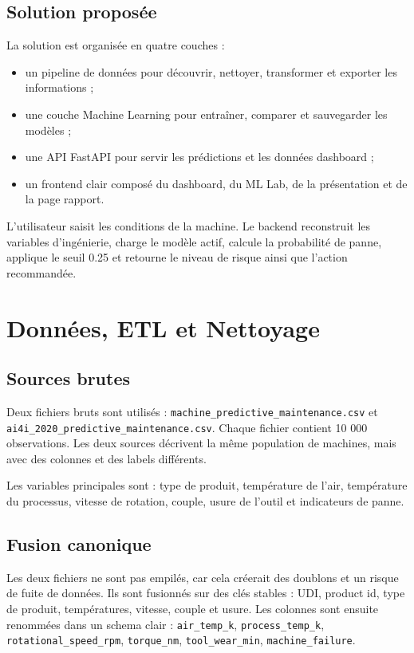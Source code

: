 \documentclass[12pt,a4paper]{report}
\begin{document}
\section{Solution proposée}
La solution est organisée en quatre couches :
\begin{itemize}
    \item un pipeline de données pour découvrir, nettoyer, transformer et exporter les informations ;
    \item une couche Machine Learning pour entraîner, comparer et sauvegarder les modèles ;
    \item une API FastAPI pour servir les prédictions et les données dashboard ;
    \item un frontend clair composé du dashboard, du ML Lab, de la présentation et de la page rapport.
\end{itemize}

L'utilisateur saisit les conditions de la machine. Le backend reconstruit les variables d'ingénierie, charge le modèle actif, calcule la probabilité de panne, applique le seuil 0.25 et retourne le niveau de risque ainsi que l'action recommandée.

\chapter{Données, ETL et Nettoyage}

\section{Sources brutes}
Deux fichiers bruts sont utilisés : \texttt{machine\_predictive\_maintenance.csv} et \texttt{ai4i\_2020\_predictive\_maintenance.csv}. Chaque fichier contient 10 000 observations. Les deux sources décrivent la même population de machines, mais avec des colonnes et des labels différents.

Les variables principales sont : type de produit, température de l'air, température du processus, vitesse de rotation, couple, usure de l'outil et indicateurs de panne.

\section{Fusion canonique}
Les deux fichiers ne sont pas empilés, car cela créerait des doublons et un risque de fuite de données. Ils sont fusionnés sur des clés stables : UDI, product id, type de produit, températures, vitesse, couple et usure. Les colonnes sont ensuite renommées dans un schema clair : \texttt{air\_temp\_k}, \texttt{process\_temp\_k}, \texttt{rotational\_speed\_rpm}, \texttt{torque\_nm}, \texttt{tool\_wear\_min}, \texttt{machine\_failure}.
\end{document}
